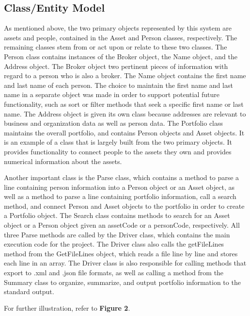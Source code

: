 \documentclass[12pt]{scrartcl} %
\begin{document}
    \subsection{Class/Entity Model}

    As mentioned above, the two primary objects represented by this system are assets and people, contained in the Asset and Person classes, respectively.  The remaining classes stem from or act upon or relate to these two classes.  The Person class contains instances of the Broker object, the Name object, and the Address object.  The Broker object two pertinent pieces of information with regard to a person who is also a broker.  The Name object contains the first name and last name of each person.  The choice to maintain the first name and last name in a separate object was made in order to support potential future functionality, such as sort or filter methods that seek a specific first name or last name.  The Address object is given its own class because addresses are relevant to business and organization data as well as person data.  The Portfolio class maintains the overall portfolio, and contains Person objects and Asset objects.  It is an example of a class that is largely built from the two primary objects.  It provides functionality to connect people to the assets they own and provides numerical information about the assets.

    Another important class is the Parse class, which contains a method to parse a line containing person information into a Person object or an Asset object, as well as a method to parse a line containing portfolio information, call a search method, and connect Person and Asset objects to the portfolio in order to create a Portfolio object.  The Search class contains methods to search for an Asset object or a Person object given an assetCode or a personCode, respectively.  All three Parse methods are called by the Driver class, which contains the main execution code for the project.  The Driver class also calls the getFileLines method from the GetFileLines object, which reads a file line by line and stores each line in an array.  The Driver class is also responsible for calling methods that export to .xml and .json file formats, as well as calling a method from the Summary class to organize, summarize, and output portfolio information to the standard output.

    For further illustration, refer to \textbf{Figure 2}.
\end{document}
